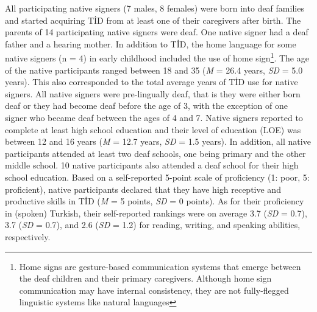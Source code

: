 \documentclass[review]{elsarticle} %
\begin{document}
All participating native signers (7 males, 8 females) were born into
deaf families and started acquiring TİD from at least one of their
caregivers after birth. The parents of 14 participating native signers
were deaf. One native signer had a deaf father and a hearing mother. In
addition to TİD, the home language for some native signers (n = 4) in
early childhood included the use of home
sign\footnote{Home signs are gesture-based communication systems that emerge between the deaf children and their primary caregivers. Although home sign communication may have internal consistency, they are not fully-flegged linguistic systems like natural languages}.
The age of the native participants ranged between 18 and 35 (\emph{M} =
26.4 years, \emph{SD} = 5.0 years). This also corresponded to the total
average years of TİD use for native signers. All native signers were
pre-lingually deaf, that is they were either born deaf or they had
become deaf before the age of 3, with the exception of one signer who
became deaf between the ages of 4 and 7. Native signers reported to
complete at least high school education and their level of education
(LOE) was between 12 and 16 years (\emph{M} = 12.7 years, \emph{SD} =
1.5 years). In addition, all native participants attended at least two
deaf schools, one being primary and the other middle school. 10 native
participants also attended a deaf school for their high school
education. Based on a self-reported 5-point scale of proficiency (1:
poor, 5: proficient), native participants declared that they have high
receptive and productive skills in TİD (\emph{M} = 5 points, \emph{SD} =
0 points). As for their proficiency in (spoken) Turkish, their
self-reported rankings were on average 3.7 (\emph{SD} = 0.7), 3.7
(\emph{SD} = 0.7), and 2.6 (\emph{SD} = 1.2) for reading, writing, and
speaking abilities, respectively.
\end{document}

